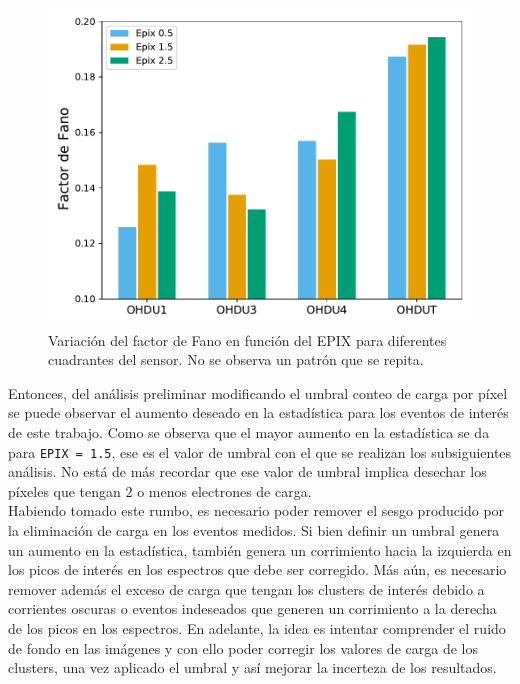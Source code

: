 \begin{figure}[h]
    \centering
    \includegraphics[scale=0.5]{Figs/Fano_vs_Epix.pdf}
    \caption{\footnotesize{Variación del factor de Fano en función del EPIX para diferentes cuadrantes del sensor. No se observa un patrón que se repita.}}
    \label{fig:FanoVsEpix}
\end{figure}
Entonces, del análisis preliminar modificando el umbral conteo de carga por píxel se puede observar el aumento deseado en la estadística para los eventos de interés de este trabajo. Como se observa que el mayor aumento en la estadística se da para \verb|EPIX = 1.5|, ese es el valor de umbral con el que se realizan los subsiguientes análisis. No está de más recordar que ese valor de umbral implica desechar los píxeles que tengan $2$ o menos electrones de carga.\\
\indent Habiendo tomado este rumbo, es necesario poder remover el sesgo producido por la eliminación de carga en los eventos medidos. Si bien definir un umbral genera un aumento en la estadística, también genera un corrimiento hacia la izquierda en los picos de interés en los espectros que debe ser corregido. Más aún, es necesario remover además el exceso de carga que tengan los clusters de interés debido a corrientes oscuras o eventos indeseados que generen un corrimiento a la derecha de los picos en los espectros. En adelante, la idea es intentar comprender el ruido de fondo en las imágenes y con ello poder corregir los valores de carga de los clusters, una vez aplicado el umbral y así mejorar la incerteza de los resultados.

